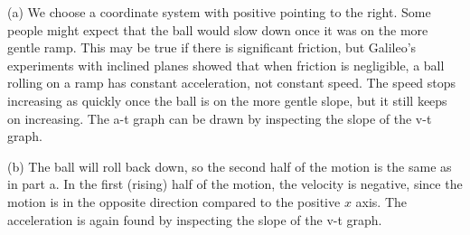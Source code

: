 (a) We choose a coordinate system with positive pointing
to the right. Some people might expect that the ball would
slow down once it was on the more gentle ramp. This may be
true if there is significant friction, but Galileo's
experiments with inclined planes showed that when friction
is negligible, a ball rolling on a ramp has constant
acceleration, not constant speed. The speed stops increasing
as quickly once the ball is on the more gentle slope, but it
still keeps on increasing. The a-t graph can be drawn by
inspecting the slope of the v-t graph.


(b) The ball will roll back down, so the second half of the
motion is the same as in part a. In the first (rising) half
of the motion, the velocity is negative, since the motion is
in the opposite direction compared to the positive $x$ axis.
The acceleration is again found by inspecting the slope of the v-t graph.




